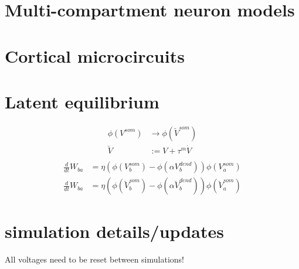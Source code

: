 \section{Multi-compartment neuron models}



\section{Cortical microcircuits}

\section{Latent equilibrium}

\begin{align*}
  \phi(V^{som}) & \rightarrow \phi(\breve{V}^{som}) \\
  \breve{V}     & := V + \tau^m \dot{V}             \\
\end{align*}
\begin{align*}
  \frac{d}{dt} W_{ba} & = \eta (\phi(V_b^{som}) - \phi(\alpha V_b^{dend})) \phi(V_a^{som})                         \\
  \frac{d}{dt} W_{ba} & = \eta (\phi(\breve{V}_b^{som}) - \phi(\alpha \breve{V}_b^{dend})) \phi(\breve{V}_a^{som})
\end{align*}


\section{simulation details/updates}

All voltages need to be reset between simulations!

